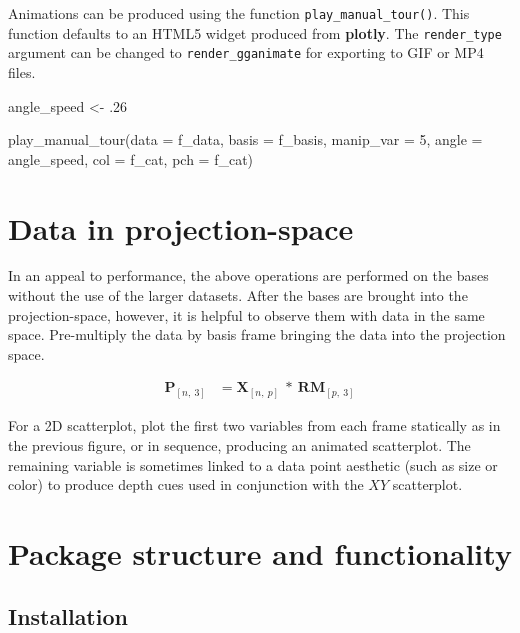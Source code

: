 Animations can be produced using the function
\texttt{play\_manual\_tour()}. This function defaults to an HTML5 widget
produced from \textbf{plotly}. The \texttt{render\_type} argument can be
changed to \texttt{render\_gganimate} for exporting to GIF or MP4 files.

\begin{Schunk}
\begin{Sinput}
angle_speed <- .26

play_manual_tour(data = f_data,
                 basis = f_basis, 
                 manip_var = 5, 
                 angle = angle_speed,
                 col = f_cat,
                 pch = f_cat)
\end{Sinput}
\end{Schunk}

\hypertarget{sec:display}{%
\section{Data in projection-space}\label{sec:display}}

In an appeal to performance, the above operations are performed on the
bases without the use of the larger datasets. After the bases are
brought into the projection-space, however, it is helpful to observe
them with data in the same space. Pre-multiply the data by basis frame
bringing the data into the projection space.

\begin{align*}
  \textbf{P}_{[n,~3]} &= \textbf{X}_{[n,~p]} ~*~ \textbf{RM}_{[p,~3]}
\end{align*}

For a 2D scatterplot, plot the first two variables from each frame
statically as in the previous figure, or in sequence, producing an
animated scatterplot. The remaining variable is sometimes linked to a
data point aesthetic (such as size or color) to produce depth cues used
in conjunction with the \(XY\) scatterplot.

\hypertarget{package-structure-and-functionality}{%
\section{Package structure and
functionality}\label{package-structure-and-functionality}}

\hypertarget{installation}{%
\subsection{Installation}\label{installation}}

